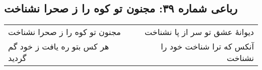 \begin{center}
\section*{رباعی شماره ۳۹: مجنون تو کوه را ز صحرا نشناخت}
\label{sec:sh039}
\begin{longtable}{l p{0.5cm} r}
مجنون تو کوه را ز صحرا نشناخت
&&
دیوانهٔ عشق تو سر از پا نشناخت
\\
هر کس بتو ره یافت ز خود گم گردید
&&
آنکس که ترا شناخت خود را نشناخت
\\
\end{longtable}
\end{center}
